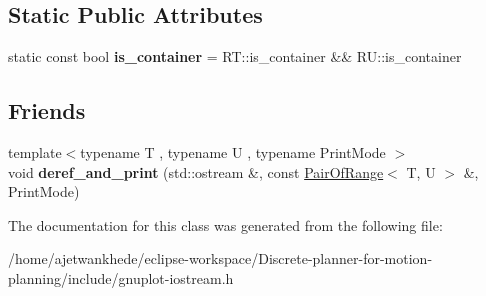 \subsection*{Static Public Attributes}
\begin{DoxyCompactItemize}
\item 
\mbox{\label{classgnuplotio_1_1PairOfRange_ab49c6567f0fa6a82fa2a6245fd964659}} 
static const bool {\bfseries is\+\_\+container} = R\+T\+::is\+\_\+container \&\& R\+U\+::is\+\_\+container
\end{DoxyCompactItemize}
\subsection*{Friends}
\begin{DoxyCompactItemize}
\item 
\mbox{\label{classgnuplotio_1_1PairOfRange_aada62f803432f04aff66f3c609329520}} 
{\footnotesize template$<$typename T , typename U , typename Print\+Mode $>$ }\\void {\bfseries deref\+\_\+and\+\_\+print} (std\+::ostream \&, const \mbox{\hyperlink{classgnuplotio_1_1PairOfRange}{Pair\+Of\+Range}}$<$ T, U $>$ \&, Print\+Mode)
\end{DoxyCompactItemize}


The documentation for this class was generated from the following file\+:\begin{DoxyCompactItemize}
\item 
/home/ajetwankhede/eclipse-\/workspace/\+Discrete-\/planner-\/for-\/motion-\/planning/include/gnuplot-\/iostream.\+h\end{DoxyCompactItemize}
